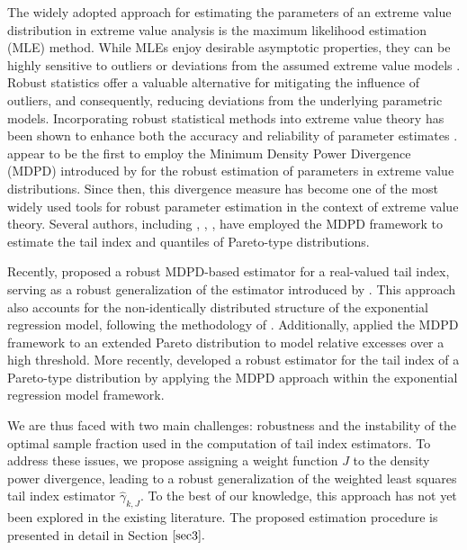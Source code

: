 \documentclass[12pt,reqno,openbib,runningheads,a4paper,portrait]{amsart}%
\begin{document}
\noindent The widely adopted approach for estimating the parameters of an
extreme value distribution in extreme value analysis is the maximum likelihood
estimation (MLE) method. While MLEs enjoy desirable asymptotic properties,
they can be highly sensitive to outliers or deviations from the assumed
extreme value models \cite{BS2000}. Robust statistics offer a valuable
alternative for mitigating the influence of outliers, and consequently,
reducing deviations from the underlying parametric models. Incorporating
robust statistical methods into extreme value theory has been shown to enhance
both the accuracy and reliability of parameter estimates \citep[][]{DE2006}.
\cite{JS2004} appear to be the first to employ the Minimum Density Power
Divergence (MDPD) introduced by \cite{Basu98} for the robust estimation of
parameters in extreme value distributions. Since then, this divergence measure
has become one of the most widely used tools for robust parameter estimation
in the context of extreme value theory. Several authors, including
\cite{Kim2008}, \cite{DGG13}, \cite{GGV2014}, \cite{DGG2021} have employed the
MDPD framework to estimate the tail index and quantiles of Pareto-type
distributions.\medskip\ 

\noindent Recently, \cite{Ghosh2017} proposed a robust MDPD-based estimator
for a real-valued tail index, serving as a robust generalization of the
estimator introduced by \cite{MB2003}. This approach also accounts for the
non-identically distributed structure of the exponential regression model,
following the methodology of \cite{GB2013}. Additionally, \cite{DGG13} applied
the MDPD framework to an extended Pareto distribution to model relative
excesses over a high threshold. More recently, \cite{MWG2023} developed a
robust estimator for the tail index of a Pareto-type distribution by applying
the MDPD approach within the exponential regression model framework.\medskip

\noindent We are thus faced with two main challenges: robustness and the
instability of the optimal sample fraction used in the computation of tail
index estimators. To address these issues, we propose assigning a weight
function $J$ to the density power divergence, leading to a robust
generalization of the weighted least squares tail index estimator
$\widehat{\gamma}_{k,J}.$ To the best of our knowledge, this approach has not
yet been explored in the existing literature. The proposed estimation
procedure is presented in detail in Section $\ref{sec3}.$\medskip
\end{document}
